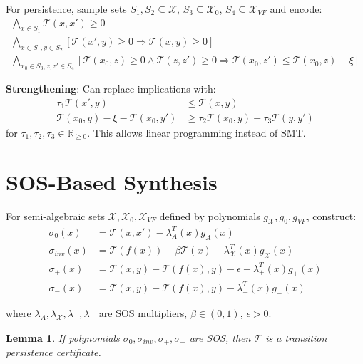 \documentclass{article}
\newtheorem{lemma}{Lemma}
\begin{document}
For persistence, sample sets $S_1, S_2 \subseteq \mathcal{X}$, $S_3 \subseteq \mathcal{X}_0$, $S_4 \subseteq \mathcal{X}_{VF}$ and encode:
\begin{align}
\bigwedge_{x \in S_1} \mathcal{T}(x, x') \geq 0\\
\bigwedge_{x \in S_1, y \in S_2} [\mathcal{T}(x', y) \geq 0 \Rightarrow \mathcal{T}(x, y) \geq 0]\\
\bigwedge_{x_0 \in S_3, z, z' \in S_4} [\mathcal{T}(x_0, z) \geq 0 \land \mathcal{T}(z, z') \geq 0 \Rightarrow \mathcal{T}(x_0, z') \leq \mathcal{T}(x_0, z) - \xi]
\end{align}

\textbf{Strengthening}: Can replace implications with:
\begin{align}
\tau_1 \mathcal{T}(x', y) &\leq \mathcal{T}(x, y)\\
\mathcal{T}(x_0, y) - \xi - \mathcal{T}(x_0, y') &\geq \tau_2 \mathcal{T}(x_0, y) + \tau_3 \mathcal{T}(y, y')
\end{align}
for $\tau_1, \tau_2, \tau_3 \in \mathbb{R}_{\geq 0}$. This allows linear programming instead of SMT.

\section{SOS-Based Synthesis}

For semi-algebraic sets $\mathcal{X}, \mathcal{X}_0, \mathcal{X}_{VF}$ defined by polynomials $g_{\mathcal{X}}, g_0, g_{VF}$, construct:
\begin{align}
\sigma_0(x) &= \mathcal{T}(x, x') - \lambda_A^T(x) g_A(x) \label{sos1}\\
\sigma_{inv}(x) &= \mathcal{T}(f(x)) - \beta \mathcal{T}(x) - \lambda_{\mathcal{X}}^T(x) g_{\mathcal{X}}(x) \label{sos2}\\
\sigma_+(x) &= \mathcal{T}(x, y) - \mathcal{T}(f(x), y) - \epsilon - \lambda_+^T(x) g_+(x) \label{sos3}\\
\sigma_-(x) &= \mathcal{T}(x, y) - \mathcal{T}(f(x), y) - \lambda_-^T(x) g_-(x) \label{sos4}
\end{align}

where $\lambda_A, \lambda_{\mathcal{X}}, \lambda_+, \lambda_-$ are SOS multipliers, $\beta \in (0, 1)$, $\epsilon > 0$.

\begin{lemma}
If polynomials $\sigma_0, \sigma_{inv}, \sigma_+, \sigma_-$ are SOS, then $\mathcal{T}$ is a transition persistence certificate.
\end{lemma}
\end{document}
